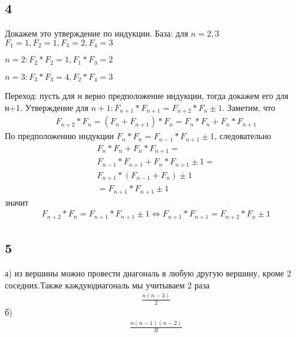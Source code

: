 		\subsection{4}
		Докажем это утверждение по индукции.
		\newline
		База: для $n = 2, 3$
		\newline
		$F_1 = 1, F_2 = 1, F_3 = 2, F_4 = 3$
		
		$n = 2: F_2*F_2 = 1, F_1*F_3 = 2$
		
		$n = 3: F_3*F_3 = 4, F_2*F_4 = 3$

		Переход:\newline
		пусть для н верно предположение индукции, тогда докажем его для н+1.
		Утверждение для $n+1: F_{n+1} * F_{n+1} = F_{n+2} * F_n \pm 1$.\newline
		Заметим, что 
		\begin{gather*}
		F_{n+2} * F_n = (F_n + F_{n+1}) * F_n = F_n*F_n + F_n*F_{n+1}
		\end{gather*}
		По предположению индукции $F_n*F_n = F_{n-1}*F_{n+1} \pm 1$, \newline
		следовательно
		\begin{gather*}
		F_n*F_n + F_n*F_{n+1} =\\ F_{n-1}*F_{n+1} + F_n*F_{n+1} \pm 1 =\\ F_{n+1}*(F_{n-1} + F_n) \pm 1 \\= F_{n+1}*F_{n+1} \pm 1
		\end{gather*}
		значит
		\begin{gather*}
		 F_{n+2} * F_n = F_{n+1}*F_{n+1} \pm 1 \Longleftrightarrow F_{n+1} * F_{n+1} = F_{n+2} * F_n \pm 1
		\end{gather*}
		
		
		\subsection{5}
		а)\newline
		из вершины можно провести диагональ в любую другую вершину, кроме 2 соседних.Также каждуюдиагональ мы учитываем 2 раза
		\begin{gather*}
		\frac{n(n-3)}{2}
		\end{gather*}
		б)\newline
		\begin{gather*}
		\frac{n(n-1)(n-2)}{3!}
		\end{gather*}
